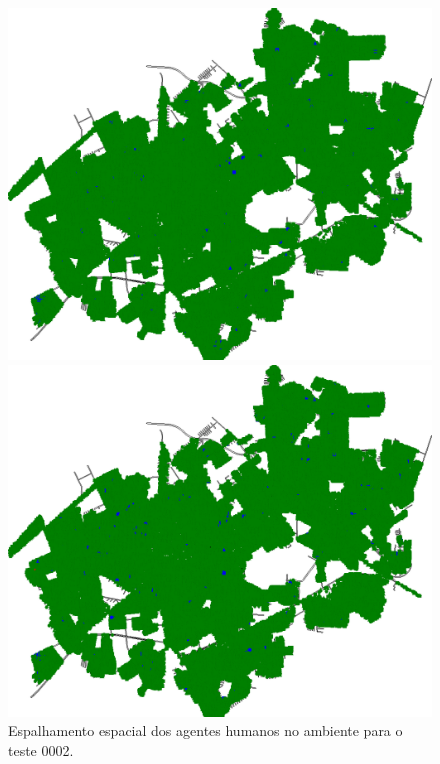 \begin{figure}[H]
\begin{minipage}{.5\textwidth}
    \captionsetup{labelformat=empty}
  \end{minipage}
  \begin{minipage}{.5\textwidth}
    \centering
    \includegraphics[width=1.0\textwidth]{Figuras/Resultados/0002/Saidas/MonteCarlo_0/Simulacao_0/Espacial/00016.png}
    \captionsetup{labelformat=empty}
  \end{minipage}%
  \begin{minipage}{.5\textwidth}
    \centering
    \includegraphics[width=1.0\textwidth]{Figuras/Resultados/0002/Saidas/MonteCarlo_0/Simulacao_0/Espacial/00020.png}
    \captionsetup{labelformat=empty}
  \end{minipage}
  \caption{Espalhamento espacial dos agentes humanos no ambiente para o teste 0002.}
  \label{fig:casos_0002}
\end{figure}


